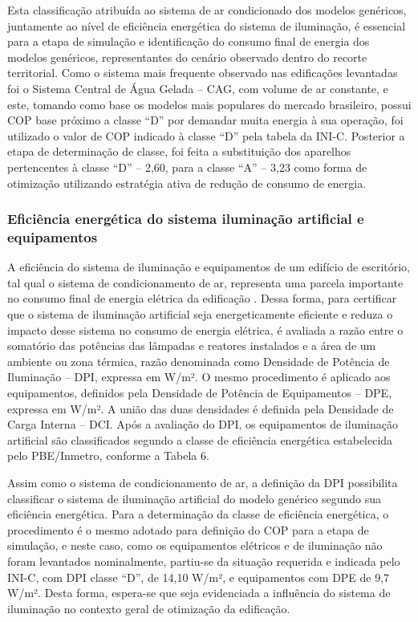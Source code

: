 \noindent Esta classificação atribuída ao sistema de ar condicionado dos modelos genéricos, juntamente 
ao nível de eficiência energética do sistema de iluminação, é essencial para a etapa de 
simulação e identificação do consumo final de energia dos modelos genéricos, representantes 
do cenário observado dentro do recorte territorial.\vspace*{0.3cm} \newline
Como o sistema mais frequente observado nas edificações levantadas foi o Sistema Central 
de Água Gelada – CAG, com volume de ar constante, e este, tomando como base os modelos mais 
populares do mercado brasileiro, possui COP base próximo a classe “D” por demandar muita 
energia à sua operação, foi utilizado o valor de COP indicado à classe “D” pela tabela da 
INI-C. Posterior a etapa de determinação de classe, foi feita a substituição dos aparelhos 
pertencentes à classe “D” – 2,60, para a classe “A” – 3,23 como forma de otimização 
utilizando estratégia ativa de redução de consumo de energia.
\subsubsection{Eficiência energética do sistema iluminação artificial e equipamentos}
A eficiência do sistema de iluminação e equipamentos de um edifício de escritório, tal 
qual o sistema de condicionamento de ar, representa uma parcela importante no consumo 
final de energia elétrica da edificação \cite{AmericanSocietyofHeatingRefrigeratingandAir-ConditioningEngineers-ASHRAE2019,ConselhoBrasileirodeConstrucaoSustentavel-CBCS2015}.\vspace*{0.3cm} \newline
Dessa forma, para certificar que o sistema de iluminação artificial seja energeticamente 
eficiente e reduza o impacto desse sistema no consumo de energia elétrica, é avaliada a 
razão entre o somatório das potências das lâmpadas e reatores instalados e a área de um 
ambiente ou zona térmica, razão denominada como Densidade de Potência de Iluminação – DPI, 
expressa em W/m². O mesmo procedimento é aplicado aos equipamentos, definidos pela Densidade 
de Potência de Equipamentos – DPE, expressa em W/m². A união das duas densidades é definida 
pela Densidade de Carga Interna – DCI.\vspace*{0.3cm} \newline
Após a avaliação do DPI, os equipamentos de iluminação artificial são classificados 
segundo a classe de eficiência energética estabelecida pelo PBE/Inmetro, conforme a Tabela 6.

Assim como o sistema de condicionamento de ar, a definição da DPI possibilita classificar o 
sistema de iluminação artificial do modelo genérico segundo sua eficiência energética. 
Para a determinação da classe de eficiência energética, o procedimento é o mesmo adotado 
para definição do COP para a etapa de simulação, e neste caso, como os equipamentos 
elétricos e de iluminação não foram levantados nominalmente, partiu-se da situação requerida 
e indicada pelo INI-C, com DPI classe “D”, de 14,10 W/m², e equipamentos com DPE de 9,7 W/m². 
Desta forma, espera-se que seja evidenciada a influência do sistema de iluminação no 
contexto geral de otimização da edificação.

